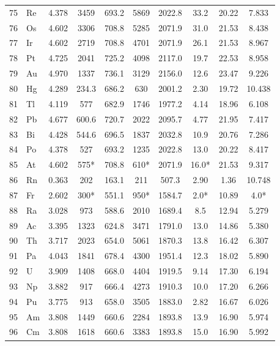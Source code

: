 \documentclass[11pt,a4paper]{article}
\begin{document}
\begin{longtable}{@{}llcccccccc@{}}
		75 & Re  & 4.378 & 3459   & 693.2  & 5869   & 2022.8 & 33.2  & 20.22 & 7.833 \\
		76 & Os  & 4.602 & 3306   & 708.8  & 5285   & 2071.9 & 31.0  & 21.53 & 8.438 \\
		77 & Ir  & 4.602 & 2719   & 708.8  & 4701   & 2071.9 & 26.1  & 21.53 & 8.967 \\
		78 & Pt  & 4.725 & 2041   & 725.2  & 4098   & 2117.0 & 19.7  & 22.53 & 8.958 \\
		79 & Au  & 4.970 & 1337   & 736.1  & 3129   & 2156.0 & 12.6  & 23.47 & 9.226 \\
		80 & Hg  & 4.289 & 234.3  & 686.2  & 630    & 2001.2 & 2.30  & 19.72 & 10.438 \\
		81 & Tl  & 4.119 & 577    & 682.9  & 1746   & 1977.2 & 4.14  & 18.96 & 6.108 \\
		82 & Pb  & 4.677 & 600.6  & 720.7  & 2022   & 2095.7 & 4.77  & 21.95 & 7.417 \\
		83 & Bi  & 4.428 & 544.6  & 696.5  & 1837   & 2032.8 & 10.9  & 20.76 & 7.286 \\
		84 & Po  & 4.378 & 527    & 693.2  & 1235   & 2022.8 & 13.0  & 20.22 & 8.417 \\
		85 & At  & 4.602 & 575*   & 708.8  & 610*   & 2071.9 & 16.0* & 21.53 & 9.317 \\
		86 & Rn  & 0.363 & 202    & 163.1  & 211    & 507.3  & 2.90  & 1.36  & 10.748 \\
		87 & Fr  & 2.602 & 300*   & 551.1  & 950*   & 1584.7 & 2.0*  & 10.89 & 4.0* \\
		88 & Ra  & 3.028 & 973    & 588.6  & 2010   & 1689.4 & 8.5   & 12.94 & 5.279 \\
		89 & Ac  & 3.395 & 1323   & 624.8  & 3471   & 1791.0 & 13.0  & 14.86 & 5.380 \\
		90 & Th  & 3.717 & 2023   & 654.0  & 5061   & 1870.3 & 13.8  & 16.42 & 6.307 \\
		91 & Pa  & 4.043 & 1841   & 678.4  & 4300   & 1951.4 & 12.3  & 18.02 & 5.890 \\
		92 & U   & 3.909 & 1408   & 668.0  & 4404   & 1919.5 & 9.14  & 17.30 & 6.194 \\
		93 & Np  & 3.882 & 917    & 666.4  & 4273   & 1910.3 & 10.0  & 17.20 & 6.266 \\
		94 & Pu  & 3.775 & 913    & 658.0  & 3505   & 1883.0 & 2.82  & 16.67 & 6.026 \\
		95 & Am  & 3.808 & 1449   & 660.6  & 2284   & 1893.8 & 13.9  & 16.90 & 5.974 \\
		96 & Cm  & 3.808 & 1618   & 660.6  & 3383   & 1893.8 & 15.0  & 16.90 & 5.992 \\

\end{longtable}
\end{document}
